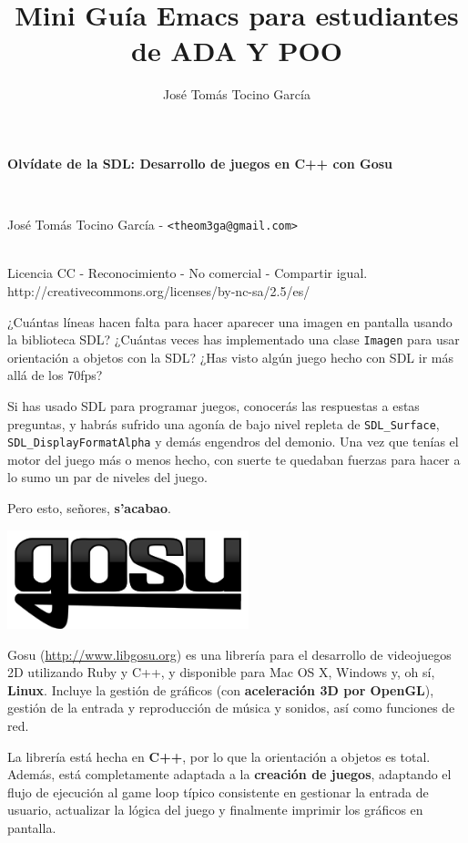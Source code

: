 \documentclass{article}
\title{Mini Guía Emacs para estudiantes de ADA Y POO}
\author{José Tomás Tocino García}
\date{}
\begin{document}
\pagestyle{empty}
\begin{center}
\begin{Large}\textbf{Olvídate de la SDL: Desarrollo de juegos en C++ con Gosu}\end{Large}\\
\begin{large}José Tomás Tocino García - \texttt{<theom3ga@gmail.com>}\end{large}\\[0.1cm]

{\small Licencia CC - Reconocimiento - No comercial - Compartir igual.\\
http://creativecommons.org/licenses/by-nc-sa/2.5/es/}
 
\end{center}

¿Cuántas líneas hacen falta para hacer aparecer una imagen en pantalla
usando la biblioteca SDL? ¿Cuántas veces has implementado una clase
\texttt{Imagen} para usar orientación a objetos con la SDL? ¿Has
visto algún juego hecho con SDL ir más allá de los 70fps?

Si has usado SDL para programar juegos, conocerás las respuestas a
estas preguntas, y habrás sufrido una agonía de bajo nivel repleta de
\texttt{SDL\_Surface}, \texttt{SDL\_DisplayFormatAlpha} y demás
engendros del demonio. Una vez que tenías el motor del
juego más o menos hecho, con suerte te quedaban fuerzas para hacer a
lo sumo un par de niveles del juego.

Pero esto, señores, \textbf{s'acabao}.

\begin{center}
  \includegraphics[width=7cm]{website_header}
\end{center}

Gosu (\url{http://www.libgosu.org}) es una librería para el desarrollo
de videojuegos 2D utilizando Ruby y C++, y disponible para Mac OS X,
Windows y, oh sí, \textbf{Linux}. Incluye la gestión de gráficos (con
\textbf{aceleración 3D por OpenGL}), gestión de la entrada y
reproducción de música y sonidos, así como funciones de red.

La librería está hecha en \textbf{C++}, por lo que la orientación a
objetos es total. Además, está completamente adaptada a la \textbf{creación de
juegos}, adaptando el flujo de ejecución al game loop típico consistente
en gestionar la entrada de usuario, actualizar la lógica del juego y
finalmente imprimir los gráficos en pantalla.
\end{document}
